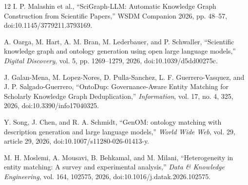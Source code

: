 \documentclass[11pt]{article}
\begin{document}
\begin{thebibliography}{12}
I. P. Malashin et al., ``SciGraph-LLM: Automatic Knowledge Graph Construction from Scientific Papers,'' WSDM Companion 2026, pp. 48--57, doi:10.1145/3779211.3793169.

A. Oarga, M. Hart, A. M. Bran, M. Lederbauer, and P. Schwaller, ``Scientific knowledge graph and ontology generation using open large language models,'' \emph{Digital Discovery}, vol. 5, pp. 1269--1279, 2026, doi:10.1039/d5dd00275c.

J. Galan-Mena, M. Lopez-Nores, D. Pulla-Sanchez, L. F. Guerrero-Vasquez, and J. P. Salgado-Guerrero, ``OntoDup: Governance-Aware Entity Matching for Scholarly Knowledge Graph Deduplication,'' \emph{Information}, vol. 17, no. 4, 325, 2026, doi:10.3390/info17040325.

Y. Song, J. Chen, and R. A. Schmidt, ``GenOM: ontology matching with description generation and large language models,'' \emph{World Wide Web}, vol. 29, article 29, 2026, doi:10.1007/s11280-026-01413-y.

M. H. Moslemi, A. Mousavi, B. Behkamal, and M. Milani, ``Heterogeneity in entity matching: A survey and experimental analysis,'' \emph{Data \& Knowledge Engineering}, vol. 164, 102575, 2026, doi:10.1016/j.datak.2026.102575.
\end{thebibliography}
\end{document}
